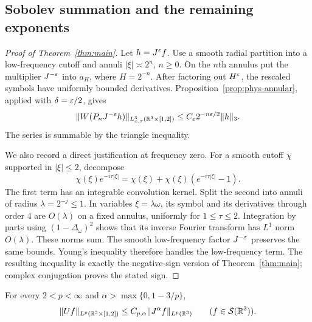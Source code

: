 \subsection{Sobolev summation and the remaining exponents}

\begin{proof}[Proof of Theorem~\ref{thm:main}]
Let $h=J^\varepsilon f$.  Use a smooth radial partition into a low-frequency
cutoff and annuli $|\xi|\asymp2^n$, $n\ge0$.  On the $n$th annulus
put the multiplier $J^{-\varepsilon}$ into $a_H$, where $H=2^{-n}$.
After factoring out $H^\varepsilon$, the rescaled symbols have uniformly
bounded derivatives.  Proposition~\ref{prop:phys-annular}, applied
with $\delta=\varepsilon/2$, gives
\[
 \lVert W(P_nJ^{-\varepsilon}h)\rVert_{L^3_{x,\tau}(\mathbb R^3\times[1,2])}
 \le C_\varepsilon 2^{-n\varepsilon/2}\lVert h\rVert_3.
\]
The series is summable by the triangle inequality.

We also record a direct justification at frequency zero.  For a
smooth cutoff $\chi$ supported in $|\xi|\le2$, decompose
\[
 \chi(\xi)e^{-i\tau|\xi|}
 =\chi(\xi)+\chi(\xi)(e^{-i\tau|\xi|}-1).
\]
The first term has an integrable convolution kernel.  Split the
second into annuli of radius $\lambda=2^{-j}\le1$.  In variables
$\xi=\lambda\omega$, its symbol and its derivatives through order
$4$ are $O(\lambda)$ on a fixed annulus, uniformly for
$1\le\tau\le2$.  Integration by parts using $(1-\Delta_\omega)^2$
shows that its inverse Fourier transform has $L^1$ norm
$O(\lambda)$.  These norms sum.  The smooth low-frequency factor
$J^{-\varepsilon}$ preserves the same bounds.  Young's inequality
therefore handles the low-frequency term.  The resulting inequality
is exactly the negative-sign version of Theorem~\ref{thm:main};
complex conjugation proves the stated sign.
\end{proof}

\begin{corollary}
\label{cor:full-range}
For every $2<p<\infty$ and
$\alpha>\max\{0,1-3/p\}$,
\begin{equation}
 \lVert Uf\rVert_{L^p(\mathbb R^3\times[1,2])}
 \le C_{p,\alpha}\lVert J^\alpha f\rVert_{L^p(\mathbb R^3)}
 \qquad(f\in\mathcal S(\mathbb R^3)).
 \label{eq:phys-full-range}
\end{equation}
\end{corollary}


